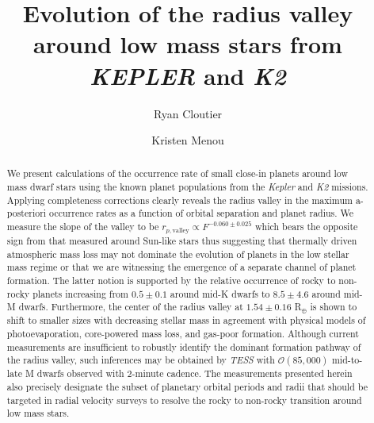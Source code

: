 \documentclass[twocolumn]{emulateapj}
\newcommand{\gaia}[1]{\emph{Gaia}#1}
\newcommand{\kepler}[1]{\emph{Kepler}#1}
\newcommand{\ktwo}[1]{\emph{K2}#1}
\newcommand{\tess}[1]{\emph{TESS}#1}
\begin{document}
\title{Evolution of the radius valley around low mass stars from \emph{KEPLER} and \emph{K2}}
\author{Ryan Cloutier}
\author{Kristen Menou}




\begin{abstract}
  We present calculations of the occurrence rate of small close-in planets around low mass dwarf stars
  using the known planet populations from the \kepler{} and \ktwo{} missions.
  Applying completeness corrections %
  clearly reveals the radius valley in the maximum a-posteriori occurrence rates as a
  function of orbital separation and planet radius. We measure the slope of the valley
  to be $r_{p,\text{valley}} \propto F^{-0.060\pm 0.025}$ which
  bears the opposite sign from that measured around Sun-like stars thus suggesting that
  thermally driven atmospheric mass loss may not dominate the evolution of planets in the low stellar mass
  regime or that we are witnessing the emergence of a separate channel of planet formation.
  The latter notion is supported by the relative occurrence of rocky to non-rocky planets
  increasing from $0.5\pm 0.1$ around mid-K dwarfs to $8.5\pm 4.6$ around mid-M dwarfs.
  Furthermore, the center of the radius valley at $1.54\pm 0.16$ R$_{\oplus}$ is
  shown to shift to smaller sizes with
  decreasing stellar mass in agreement with physical models of photoevaporation,
  core-powered mass loss, and gas-poor formation. Although current measurements are
  insufficient to robustly identify the dominant formation pathway of the radius valley,
  such inferences may be obtained by \tess{} with $\mathcal{O}(85,000)$
  mid-to-late M dwarfs observed with 2-minute cadence.
  The measurements presented herein also precisely designate the subset of planetary orbital periods
  and radii that should be targeted in radial velocity surveys to resolve the rocky to non-rocky
  transition around low mass stars. 
\end{abstract}
\end{document}
